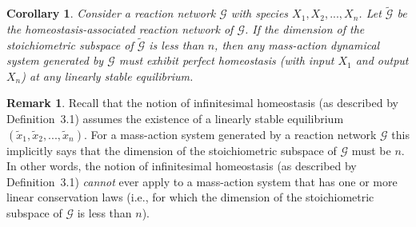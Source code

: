 \documentclass[11pt]{article}
\theoremstyle{plain}
\newtheorem{corollary}[theorem]{Corollary}
\theoremstyle{definition}
\newtheorem{remark}[theorem]{Remark}
\theoremstyle{remark}
\newcommand\GG{\mathcal{G}}
\begin{document}
\begin{corollary}\label{cor:reaction_network_perfect_homeostasis}
Consider a reaction network $\GG$ with species $X_1,X_2,...,X_n$. Let $\tilde{\GG}$ be the homeostasis-associated reaction network of $\GG$. If the dimension of the stoichiometric subspace of $\tilde{\GG}$ is less than $n$, then any mass-action dynamical system generated by $\GG$ must exhibit perfect homeostasis (with input $X_1$ and output $X_n$) at any linearly stable equilibrium.
\end{corollary}




\bigskip

\begin{remark}
Recall that the notion of infinitesimal homeostasis (as described by Definition~3.1) assumes the existence of a linearly stable equilibrium $(\tilde{x}_1,\tilde{x}_2,...,\tilde{x}_n)$. For a mass-action system generated by a reaction network  $\GG$ this implicitly says that the dimension of the stoichiometric subspace of $\GG$ must be $n$. In other words, the notion of infinitesimal homeostasis (as described by Definition~3.1) {\em cannot} ever apply to a mass-action system that has one or more linear conservation laws (i.e., for which the dimension of the stoichiometric subspace of $\GG$ is less than $n$). 
\end{remark}





\begin{comment}
\section{Species-Reaction Graph}

Note that SR graph does not include the inflow/outflow reactions.

If the SR graph of the reaction network satisfies the following conditions:

\begin{enumerate}
\item all cycles are o-cycles or 1-cycles and
\item no two even cycles have an S-to-R intersection.
\end{enumerate}
%
then the reaction network is injective. Thus the SR graph gives a \textbf{sufficient} condition for injectivity, but not a necessary one.

\end{comment}
\end{document}
